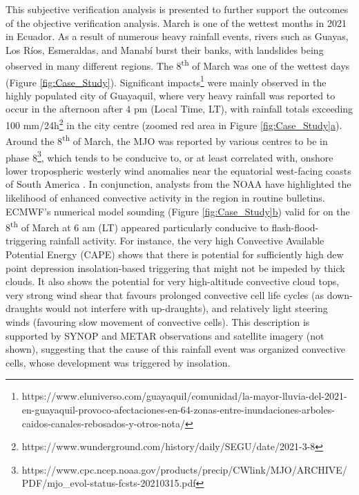 \documentclass[techmemo]{ecmwfrep}%
\begin{document}
This subjective verification analysis is presented to further support the outcomes of the objective verification analysis. March is one of the wettest months in 2021 in Ecuador. As a result of numerous heavy rainfall events, rivers such as Guayas, Los Ríos, Esmeraldas, and Manabí burst their banks, with landslides being observed in many different regions. The 8\textsuperscript{th} of March was one of the wettest days (Figure \ref{fig:Case_Study}). Significant impacts\footnote{https://www.eluniverso.com/guayaquil/comunidad/la-mayor-lluvia-del-2021-en-guayaquil-provoco-afectaciones-en-64-zonas-entre-inundaciones-arboles-caidos-canales-rebosados-y-otros-nota/} were mainly observed in the highly populated city of Guayaquil, where very heavy rainfall was reported to occur in the afternoon after 4 pm (Local Time, LT), with rainfall totals exceeding 100 mm/24h\footnote{https://www.wunderground.com/history/daily/SEGU/date/2021-3-8} in the city centre (zoomed red area in Figure \ref{fig:Case_Study}\hyperref[fig:Case_Study]{a}). Around the 8\textsuperscript{th} of March, the MJO was reported by various centres to be in phase 8\footnote{https://www.cpc.ncep.noaa.gov/products/precip/CWlink/MJO/ARCHIVE/PDF/mjo_evol-status-fcsts-20210315.pdf}, which tends to be conducive to, or at least correlated with, onshore lower tropospheric westerly wind anomalies near the equatorial west-facing coasts of South America \citep{Wheeler2004}. In conjunction, analysts from the NOAA have highlighted the likelihood of enhanced convective activity in the region in routine bulletins. ECMWF’s numerical model sounding (Figure \ref{fig:Case_Study}\hyperref[fig:Case_Study]{b}) valid for on the 8\textsuperscript{th} of March at 6 am (LT) appeared particularly conducive to flash-flood-triggering rainfall activity. For instance, the very high Convective Available Potential Energy (CAPE) shows that there is potential for sufficiently high dew point depression insolation-based triggering that might not be impeded by thick clouds. It also shows the potential for very high-altitude convective cloud tops, very strong wind shear that favours prolonged convective cell life cycles (as down-draughts would not interfere with up-draughts), and relatively light steering winds (favouring slow movement of convective cells). This description is supported by SYNOP and METAR observations and satellite imagery (not shown), suggesting that the cause of this rainfall event was organized convective cells, whose development was triggered by insolation. 
\end{document}

